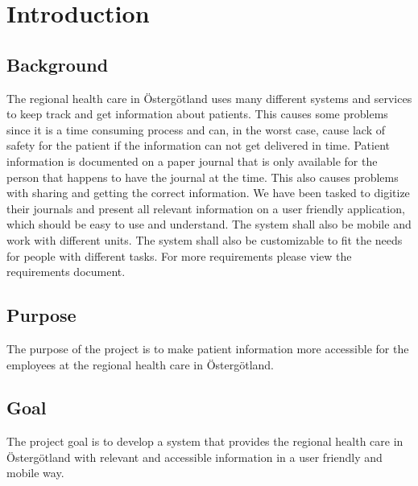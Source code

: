 \section{Introduction}
\label{sec:introduction}

\subsection{Background}
\label{sec:background}
The regional health care in Östergötland uses many different systems and services to keep track and get information about patients. This causes some problems since it is a time consuming process and can, in the worst case, cause lack of safety for the patient if the information can not get delivered in time. Patient information is documented on a paper journal that is only available for the person that happens to have the journal at the time. This also causes problems with sharing and getting the correct information. We have been tasked to digitize their journals and present all relevant information on a user friendly application, which should be easy to use and understand. The system shall also be mobile and work with different units. The system shall also be customizable to fit the needs for people with different tasks. For more requirements please view the requirements document. 


\subsection{Purpose}
\label{sec:purpose}
The purpose of the project is to make patient information more accessible for the employees at the regional health care in Östergötland.


\subsection{Goal}
\label{sec:goal}
The project goal is to develop a system that provides the regional health care in Östergötland with relevant and accessible information in a user friendly and mobile way.


